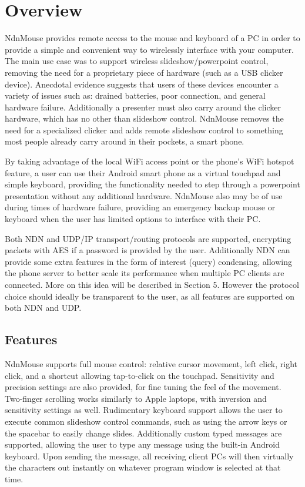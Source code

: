 \documentclass{sig-alternate}
\renewcommand\_{\textunderscore\allowbreak}  %
\begin{document}
\section{Overview}
NdnMouse provides remote access to the mouse and keyboard of a PC in order to provide a simple and convenient way to wirelessly interface with your computer. The main use case was to support wireless slideshow/powerpoint control, removing the need for a proprietary piece of hardware (such as a USB clicker device). Anecdotal evidence suggests that users of these devices encounter a variety of issues such as: drained batteries, poor connection, and general hardware failure. Additionally a presenter must also carry around the clicker hardware, which has no other than slideshow control. NdnMouse removes the need for a specialized clicker and adds remote slideshow control to something most people already carry around in their pockets, a smart phone. 

By taking advantage of the local WiFi access point or the phone's WiFi hotspot feature, a user can use their Android smart phone as a virtual touchpad and simple keyboard, providing the functionality needed to step through a powerpoint presentation without any additional hardware. NdnMouse also may be of use during times of hardware failure, providing an emergency backup mouse or keyboard when the user has limited options to interface with their PC.

Both NDN and UDP/IP transport/routing protocols are supported, encrypting packets with AES if a password is provided by the user. Additionally NDN can provide some extra features in the form of interest (query) condensing, allowing the phone server to better scale its performance when multiple PC clients are connected. More on this idea will be described in Section 5. However the protocol choice should ideally be transparent to the user, as all features are supported on both NDN and UDP.

\subsection{Features}
NdnMouse supports full mouse control: relative cursor movement, left click, right click, and a shortcut allowing tap-to-click on the touchpad. Sensitivity and precision settings are also provided, for fine tuning the feel of the movement. Two-finger scrolling works similarly to Apple laptops, with inversion and sensitivity settings as well. Rudimentary keyboard support allows the user to execute common slideshow control commands, such as using the arrow keys or the spacebar to easily change slides. Additionally custom typed messages are supported, allowing the user to type any message using the built-in Android keyboard. Upon sending the message, all receiving client PCs will then virtually the characters out instantly on whatever program window is selected at that time.
\end{document}
